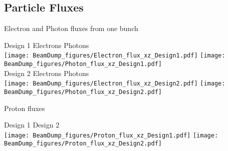 \documentclass[xcolor={dvipsnames}]{beamer}
\begin{document}
\subsection{Particle Fluxes}
\begin{frame}{Electron and Photon fluxes from one bunch}
\begin{center}
Design 1 \hspace*{1.4cm} Electrons \hfill Photons \hspace*{3.1cm} \\
 \texttt{[image: BeamDump\_figures/Electron\_flux\_xz\_Design1.pdf]}
  \texttt{[image: BeamDump\_figures/Photon\_flux\_xz\_Design1.pdf]}\\
Design 2 \hspace*{1.4cm} Electrons \hfill Photons \hspace*{3.1cm} \\ 
\texttt{[image: BeamDump\_figures/Electron\_flux\_xz\_Design2.pdf]}
  \texttt{[image: BeamDump\_figures/Photon\_flux\_xz\_Design2.pdf]}
\end{center}
\end{frame}
\begin{frame}{Proton fluxes}
\begin{center}
\hspace*{2cm} Design 1 \hfill Design 2 \hspace*{2cm} \\
  \texttt{[image: BeamDump\_figures/Proton\_flux\_xz\_Design1.pdf]}
    \texttt{[image: BeamDump\_figures/Proton\_flux\_xz\_Design2.pdf]}
\end{center}
\end{frame}
\end{document}

